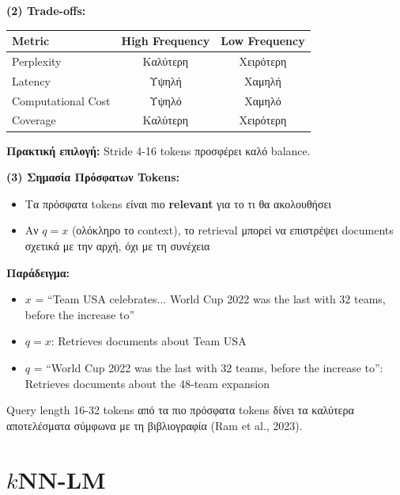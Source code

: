 \textbf{(2) Trade-offs:}

\begin{center}
\begin{tabular}{lcc}
\toprule
\textbf{Metric} & \textbf{High Frequency} & \textbf{Low Frequency} \\
\midrule
Perplexity & Καλύτερη & Χειρότερη \\
Latency & Υψηλή & Χαμηλή \\
Computational Cost & Υψηλό & Χαμηλό \\
Coverage & Καλύτερη & Χειρότερη \\
\bottomrule
\end{tabular}
\end{center}

\textbf{Πρακτική επιλογή:} Stride 4-16 tokens προσφέρει καλό balance.

\textbf{(3) Σημασία Πρόσφατων Tokens:}

\begin{itemize}
    \item Τα πρόσφατα tokens είναι πιο \textbf{relevant} για το τι θα ακολουθήσει
    \item Αν $q = x$ (ολόκληρο το context), το retrieval μπορεί να επιστρέψει
    documents σχετικά με την αρχή, όχι με τη συνέχεια
\end{itemize}

\textbf{Παράδειγμα:}
\begin{itemize}
    \item $x$ = ``Team USA celebrates... World Cup 2022 was the last with 32 teams, before the increase to''
    \item $q = x$: Retrieves documents about Team USA
    \item $q$ = ``World Cup 2022 was the last with 32 teams, before the increase to'': Retrieves documents about the 48-team expansion
\end{itemize}

\begin{infobox}
Query length 16-32 tokens από τα πιο πρόσφατα tokens δίνει τα καλύτερα αποτελέσματα
σύμφωνα με τη βιβλιογραφία (Ram et al., 2023).
\end{infobox}


\section{$k$NN-LM}

